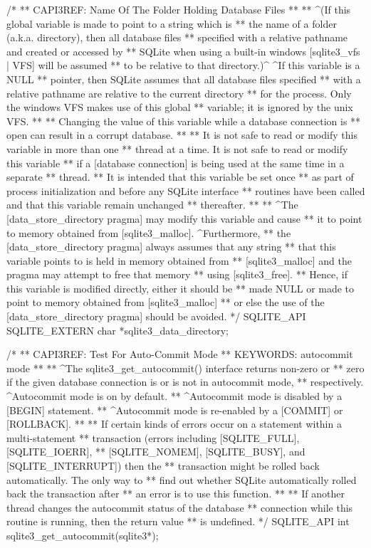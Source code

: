 \begin{Codex}[label=sqlite3.h,numbers=left]
{/*
** CAPI3REF: Name Of The Folder Holding Database Files
**
** ^(If this global variable is made to point to a string which is
** the name of a folder (a.k.a. directory), then all database files
** specified with a relative pathname and created or accessed by
** SQLite when using a built-in windows [sqlite3_vfs | VFS] will be assumed
** to be relative to that directory.)^ ^If this variable is a NULL
** pointer, then SQLite assumes that all database files specified
** with a relative pathname are relative to the current directory
** for the process.  Only the windows VFS makes use of this global
** variable; it is ignored by the unix VFS.
**
** Changing the value of this variable while a database connection is
** open can result in a corrupt database.
**
** It is not safe to read or modify this variable in more than one
** thread at a time.  It is not safe to read or modify this variable
** if a [database connection] is being used at the same time in a separate
** thread.
** It is intended that this variable be set once
** as part of process initialization and before any SQLite interface
** routines have been called and that this variable remain unchanged
** thereafter.
**
** ^The [data_store_directory pragma] may modify this variable and cause
** it to point to memory obtained from [sqlite3_malloc].  ^Furthermore,
** the [data_store_directory pragma] always assumes that any string
** that this variable points to is held in memory obtained from 
** [sqlite3_malloc] and the pragma may attempt to free that memory
** using [sqlite3_free].
** Hence, if this variable is modified directly, either it should be
** made NULL or made to point to memory obtained from [sqlite3_malloc]
** or else the use of the [data_store_directory pragma] should be avoided.
*/
SQLITE_API SQLITE_EXTERN char *sqlite3_data_directory;

/*
** CAPI3REF: Test For Auto-Commit Mode
** KEYWORDS: {autocommit mode}
**
** ^The sqlite3_get_autocommit() interface returns non-zero or
** zero if the given database connection is or is not in autocommit mode,
** respectively.  ^Autocommit mode is on by default.
** ^Autocommit mode is disabled by a [BEGIN] statement.
** ^Autocommit mode is re-enabled by a [COMMIT] or [ROLLBACK].
**
** If certain kinds of errors occur on a statement within a multi-statement
** transaction (errors including [SQLITE_FULL], [SQLITE_IOERR],
** [SQLITE_NOMEM], [SQLITE_BUSY], and [SQLITE_INTERRUPT]) then the
** transaction might be rolled back automatically.  The only way to
** find out whether SQLite automatically rolled back the transaction after
** an error is to use this function.
**
** If another thread changes the autocommit status of the database
** connection while this routine is running, then the return value
** is undefined.
*/
SQLITE_API int sqlite3_get_autocommit(sqlite3*);

}
\end{Codex}
